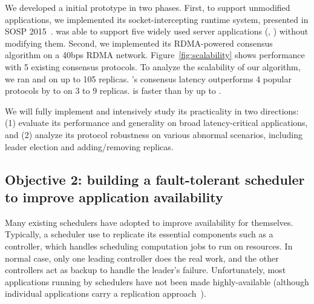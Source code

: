 
 We developed a \falcon initial prototype in two 
phases. First, to support unmodified applications, we implemented its 
socket-intercepting runtime system, presented in SOSP 2015~\cite{crane:sosp15}. 
\falcon was able to support five widely used server applications (\eg, \mysql) 
without modifying them. Second, we implemented its RDMA-powered consensus 
algorithm on a 40bps RDMA network. Figure~\ref{fig:scalability} shows \falcon 
performance with 5 existing consensus protocols. To analyze the scalability
of our algorithm, we ran \falcon and \dare on up to 105 replicas. \falcon's 
consensus latency outperforms 4 popular \paxos  protocols by \comptradlow to 
\comptradhigh on 3 to 9 replicas. \falcon is  faster than \dare by up to 
\fasterDARE.



 We will fully implement \falcon and intensively study its 
practicality in two directions: (1) evaluate its performance and generality on 
broad latency-critical applications, and (2) analyze its protocol robustness on 
various abnormal scenarios, including leader election and adding/removing replicas.

\vspace{-.15in}\subsection{Objective 2: 
building a fault-tolerant scheduler to improve 
application availability}\label{sec:scheduler}\vspace{-.075in}

Many existing schedulers have adopted \paxos to improve availability for 
themselves. Typically, a scheduler use \paxos to replicate its essential 
components such as a controller, which handles scheduling computation jobs 
to run on resources. In normal case, only one leading controller does the real 
work, and the other controllers act as backup to handle the leader's failure. 
Unfortunately, most applications running by schedulers have not been made 
highly-available (although individual applications carry a replication 
approach~\cite{mapreduce,dolly:nsdi13}).

